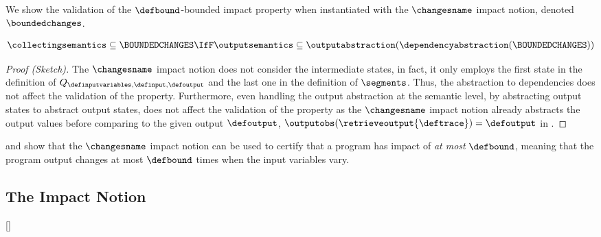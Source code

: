 We show the validation of the $\defbound$-bounded impact property when instantiated with the $\changesname$ impact notion,
denoted $\boundedchanges$.

\begin{lemma}
  \begin{align*}
    \collectingsemantics \subseteq \BOUNDEDCHANGES \IfF \outputsemantics \subseteq \outputabstraction(\dependencyabstraction(\BOUNDEDCHANGES))
  \end{align*}
\end{lemma}
\begin{proof}[Proof (Sketch)]
  The $\changesname$ impact notion does not consider the intermediate states, in fact, it only employs the first state in the definition of $Q_{\definputvariables, \definput, \defoutput}$ and the last one in the definition of $\segments$.
  Thus, the abstraction to dependencies does not affect the validation of the property.
  Furthermore, even handling the output abstraction at the semantic level, by abstracting output states to abstract output states, does not affect the validation of the property as the $\changesname$ impact notion already abstracts the output values before comparing to the given output $\defoutput$, \cf{} $\outputobs(\retrieveoutput{\deftrace}) = \defoutput$ in .
\end{proof}

 and  show that the $\changesname$ impact notion can be used to certify that a program has impact of \emph{at most} $\defbound$, meaning that the program output changes at most $\defbound$ times when the input variables vary.


\subsection{The \qlibraname{} Impact Notion}[\qlibraname]

